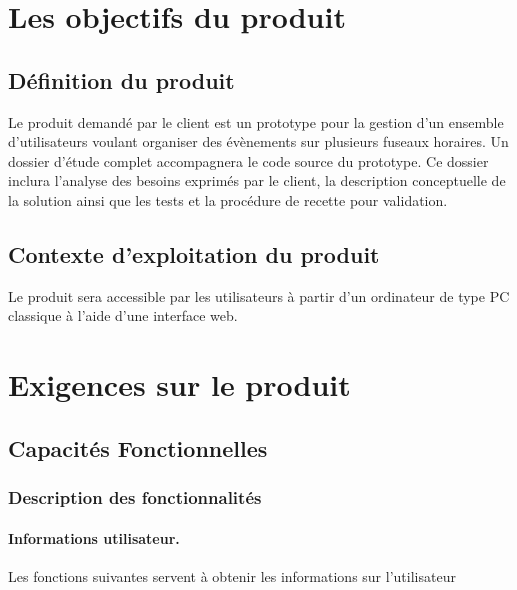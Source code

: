 \documentclass[majeure,gl]{tb}
\begin{document}
\section{Les objectifs du produit}

\subsection{Définition du produit}
Le produit demandé par le client est un prototype pour la gestion d'un
ensemble d'utilisateurs voulant organiser des évènements sur plusieurs fuseaux horaires. Un dossier d'étude complet accompagnera le code source du
prototype. Ce dossier inclura l'analyse des besoins  exprimés par le
client, la description conceptuelle de la solution ainsi que les tests
et la procédure de recette pour validation.


\subsection{Contexte d'exploitation du produit}
Le produit sera accessible par les utilisateurs à partir d'un
ordinateur de type PC classique à l'aide d'une interface web.

\section{Exigences sur le produit}
\label{sec:exigence}

\subsection{Capacités Fonctionnelles}
\label{fonc}

\subsubsection{Description des fonctionnalités}

\paragraph{Informations utilisateur.} Les fonctions suivantes servent à obtenir les informations sur l'utilisateur
\end{document}
